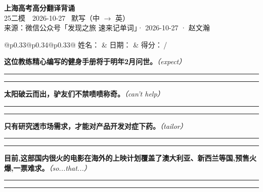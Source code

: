 \documentclass[11pt,a4paper]{article}
\newcommand{\num}[1]{\makebox[1.9em][r]{#1.}\hspace{0.3em}}
\newcommand{\wline}{\noindent\rule{\linewidth}{0.4pt}}
\newcommand{\prompt}[1]{\emph{\textcolor{tipblue}{\small（#1）}}}
\begin{document}
\pagestyle{plain}
\begin{center}
{\LARGE\bfseries 上海高考高分翻译背诵 }\\[0.25em]
{\large 25二模　2026-10-27 \quad\ 默写（中 $\to$ 英）}\\[0.35em]
{\footnotesize 来源：微信公众号「发现之旅 速来记单词」· 2026-10-27 · 赵文瀚}
\end{center}

\vspace{0.4em}
\noindent\begin{tabular}{@{}p{0.33\textwidth}@{}p{0.34\textwidth}@{}p{0.33\textwidth}@{}}
姓名：\underline{\hspace{2.0cm}} & 日期：\underline{\hspace{2.0cm}} & 得分：\underline{\hspace{1.4cm}}\,/ \\
\end{tabular}

\vspace{0.5em}

\vspace{0.8em}
\num{1}\textbf{这位教练精心编写的健身手册将于明年2月问世。}\prompt{expect}

\vspace{0.3em}

\wline\vspace{0.3em}
\wline

\num{2}\textbf{太阳破云而出，驴友们不禁啧啧称奇。}\prompt{can't help}

\vspace{0.3em}

\wline\vspace{0.3em}
\wline

\num{3}\textbf{只有研究透市场需求，才能对产品开发对症下药。}\prompt{tailor}

\vspace{0.3em}

\wline\vspace{0.3em}
\wline

\num{4}\textbf{目前,这部国内很火的电影在海外的上映计划覆盖了澳大利亚、新西兰等国,预售火爆,一票难求。}\prompt{so...that...}

\vspace{0.3em}

\wline\vspace{0.3em}
\wline
\end{document}
